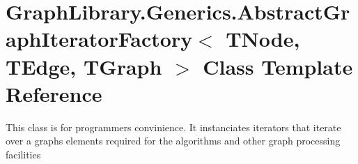 \hypertarget{class_graph_library_1_1_generics_1_1_abstract_graph_iterator_factory}{}\section{Graph\+Library.\+Generics.\+Abstract\+Graph\+Iterator\+Factory$<$ T\+Node, T\+Edge, T\+Graph $>$ Class Template Reference}
\label{class_graph_library_1_1_generics_1_1_abstract_graph_iterator_factory}


This class is for programmers convinience. It instanciates iterators that iterate over a graph\textquotesingle{}s elements required for the algorithms and other graph processing facilities  


